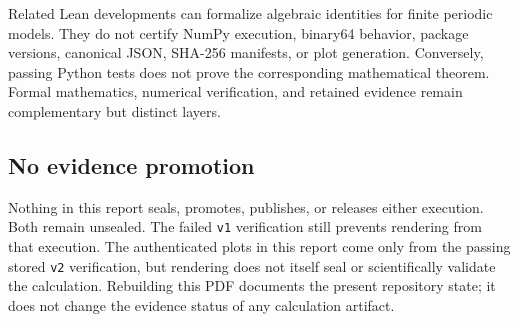 Related Lean developments can formalize algebraic identities for finite periodic models.
They do not certify NumPy execution, binary64 behavior, package versions, canonical JSON,
SHA-256 manifests, or plot generation.  Conversely, passing Python tests does not prove
the corresponding mathematical theorem.  Formal mathematics, numerical verification,
and retained evidence remain complementary but distinct layers.

\subsection{No evidence promotion}

Nothing in this report seals, promotes, publishes, or releases either execution.  Both
remain unsealed.  The failed \texttt{v1} verification still prevents rendering from that
execution.  The authenticated plots in this report come only from the passing stored
\texttt{v2} verification, but rendering does not itself seal or scientifically validate
the calculation.  Rebuilding this PDF documents the present repository state; it does
not change the evidence status of any calculation artifact.
